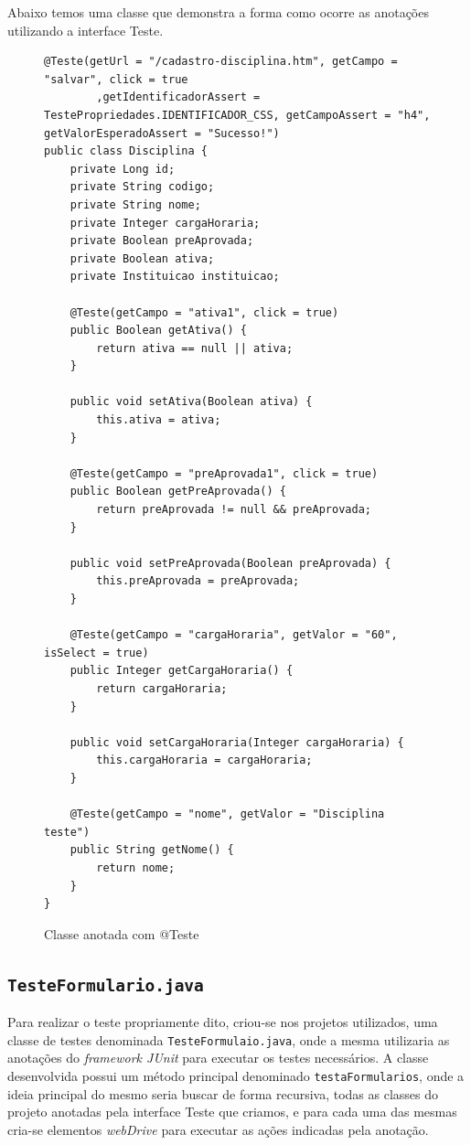 \documentclass[tg]{mdtufsm}
\begin{document}
Abaixo temos uma classe que demonstra a forma como ocorre as anotações utilizando a interface Teste.

\begin{figure}[!htb]
\begin{lstlisting}
@Teste(getUrl = "/cadastro-disciplina.htm", getCampo = "salvar", click = true
        ,getIdentificadorAssert = TestePropriedades.IDENTIFICADOR_CSS, getCampoAssert = "h4", getValorEsperadoAssert = "Sucesso!")
public class Disciplina {
    private Long id;
    private String codigo;
    private String nome;
    private Integer cargaHoraria;
    private Boolean preAprovada;
    private Boolean ativa;
    private Instituicao instituicao;
   
    @Teste(getCampo = "ativa1", click = true)
    public Boolean getAtiva() {
        return ativa == null || ativa;
    }

    public void setAtiva(Boolean ativa) {
        this.ativa = ativa;
    }

    @Teste(getCampo = "preAprovada1", click = true)
    public Boolean getPreAprovada() {
        return preAprovada != null && preAprovada;
    }

    public void setPreAprovada(Boolean preAprovada) {
        this.preAprovada = preAprovada;
    }

    @Teste(getCampo = "cargaHoraria", getValor = "60", isSelect = true)
    public Integer getCargaHoraria() {
        return cargaHoraria;
    }

    public void setCargaHoraria(Integer cargaHoraria) {
        this.cargaHoraria = cargaHoraria;
    }

    @Teste(getCampo = "nome", getValor = "Disciplina teste")
    public String getNome() {
        return nome;
    }
}
\end{lstlisting}
	\caption{Classe anotada com @Teste}
	\label{code:Disciplina.java}
\end{figure}

\subsection{\texttt{TesteFormulario.java}}
Para realizar o teste propriamente dito, criou-se nos projetos utilizados, uma classe de testes denominada \texttt{TesteFormulaio.java}, onde a mesma utilizaria as anotações do \emph{framework JUnit}  para executar os testes necessários. A classe desenvolvida possui um método principal denominado \texttt{testaFormularios}, onde a ideia principal do mesmo seria buscar de forma recursiva, todas as classes do projeto anotadas pela interface Teste que criamos, e para cada uma das mesmas cria-se elementos \emph{webDrive} para executar as ações indicadas pela anotação. 
\end{document}
